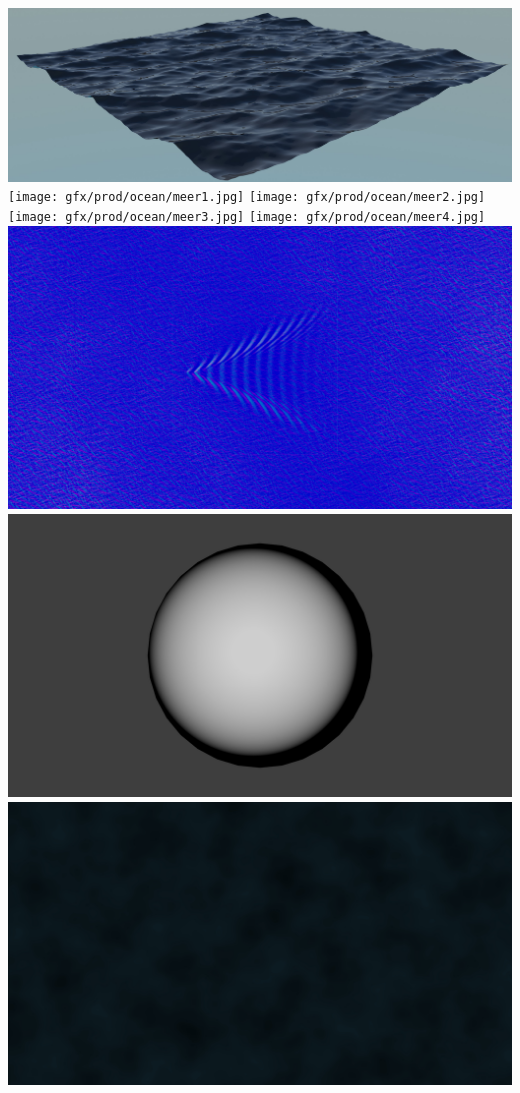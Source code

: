 \includegraphics[width=\textwidth /2]{gfx/prod/ocean/meer0.jpg}
\texttt{[image: gfx/prod/ocean/meer1.jpg]}
\texttt{[image: gfx/prod/ocean/meer2.jpg]}
\texttt{[image: gfx/prod/ocean/meer3.jpg]}
\texttt{[image: gfx/prod/ocean/meer4.jpg]}
\includegraphics[width=\textwidth /2]{gfx/prod/ocean/meer5.jpg}
\includegraphics[width=\textwidth /2]{gfx/prod/ocean/meer6.jpg}
\includegraphics[width=\textwidth /2]{gfx/prod/ocean/meer7.jpg}


